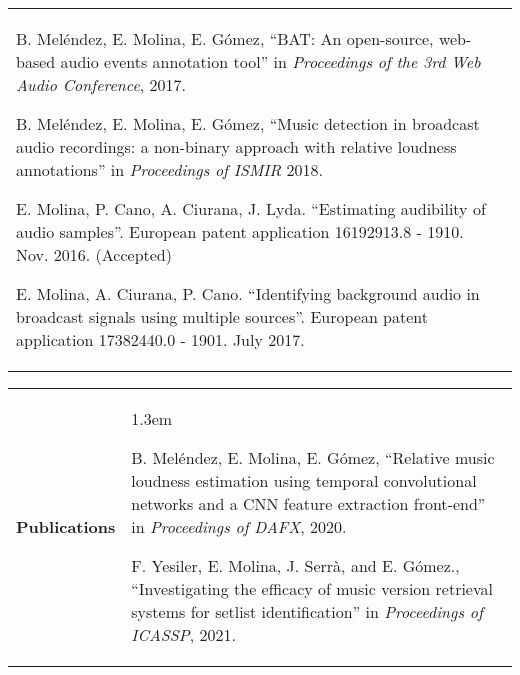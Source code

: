 \documentclass[letterpaper,11pt,oneside]{article}
\begin{document}
\begin{tabularx}{\linewidth}{l X}
\begin{itemize*}
  \item B. Meléndez, E. Molina, E. Gómez, ``BAT: An open-source, web-based audio events annotation tool'' in \textit{Proceedings of the 3rd Web Audio Conference}, 2017.
  
  \item B. Meléndez, E. Molina, E. Gómez, ``Music detection in broadcast audio recordings: a non-binary approach with relative loudness annotations'' in \textit{Proceedings of ISMIR} 2018.
 
 \item E. Molina, P. Cano, A. Ciurana, J. Lyda. ``Estimating audibility of audio samples''. European patent application 16192913.8 - 1910. Nov. 2016. (Accepted)
 
 \item E. Molina, A. Ciurana, P. Cano. ``Identifying background audio in broadcast signals using multiple sources''. European patent application 17382440.0 - 1901. July 2017.
 \end{itemize*}
\end{tabularx}

\newpage
\noindent \begin{tabularx}{\linewidth}{l X}
\Large{\textbf{Publications}\vspace{4cm}} & \begin{itemize*}
 \small
 \itemsep1.3em 

 \item B. Meléndez, E. Molina, E. Gómez, ``Relative music loudness estimation using temporal convolutional networks and a CNN feature extraction front-end'' in \textit{Proceedings of DAFX}, 2020.

 \item F. Yesiler, E. Molina, J. Serrà, and E. Gómez., ``Investigating the efficacy of music version retrieval systems for setlist identification'' in \textit{Proceedings of ICASSP}, 2021.
 \end{itemize*}
\end{tabularx}
\end{document}

